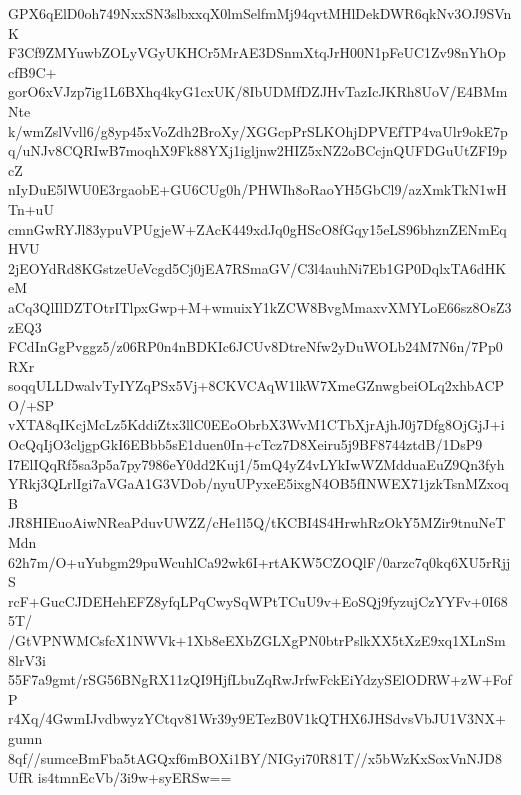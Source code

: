 GPX6qElD0oh749NxxSN3slbxxqX0lmSelfmMj94qvtMHlDekDWR6qkNv3OJ9SVnK
F3Cf9ZMYuwbZOLyVGyUKHCr5MrAE3DSnmXtqJrH00N1pFeUC1Zv98nYhOpcfB9C+
gorO6xVJzp7ig1L6BXhq4kyG1cxUK/8IbUDMfDZJHvTazIcJKRh8UoV/E4BMmNte
k/wmZslVvll6/g8yp45xVoZdh2BroXy/XGGcpPrSLKOhjDPVEfTP4vaUlr9okE7p
q/uNJv8CQRIwB7moqhX9Fk88YXj1igljnw2HIZ5xNZ2oBCcjnQUFDGuUtZFI9pcZ
nIyDuE5lWU0E3rgaobE+GU6CUg0h/PHWIh8oRaoYH5GbCl9/azXmkTkN1wHTn+uU
cmnGwRYJl83ypuVPUgjeW+ZAcK449xdJq0gHScO8fGqy15eLS96bhznZENmEqHVU
2jEOYdRd8KGstzeUeVcgd5Cj0jEA7RSmaGV/C3l4auhNi7Eb1GP0DqlxTA6dHKeM
aCq3QlIlDZTOtrITlpxGwp+M+wmuixY1kZCW8BvgMmaxvXMYLoE66sz8OsZ3zEQ3
FCdInGgPvggz5/z06RP0n4nBDKIc6JCUv8DtreNfw2yDuWOLb24M7N6n/7Pp0RXr
soqqULLDwalvTyIYZqPSx5Vj+8CKVCAqW1lkW7XmeGZnwgbeiOLq2xhbACPO/+SP
vXTA8qIKcjMcLz5KddiZtx3llC0EEoObrbX3WvM1CTbXjrAjhJ0j7Dfg8OjGjJ+i
OcQqIjO3cljgpGkI6EBbb5sE1duen0In+cTcz7D8Xeiru5j9BF8744ztdB/1DsP9
I7ElIQqRf5sa3p5a7py7986eY0dd2Kuj1/5mQ4yZ4vLYkIwWZMdduaEuZ9Qn3fyh
YRkj3QLrlIgi7aVGaA1G3VDob/nyuUPyxeE5ixgN4OB5fINWEX71jzkTsnMZxoqB
JR8HIEuoAiwNReaPduvUWZZ/cHe1l5Q/tKCBI4S4HrwhRzOkY5MZir9tnuNeTMdn
62h7m/O+uYubgm29puWcuhlCa92wk6I+rtAKW5CZOQlF/0arzc7q0kq6XU5rRjjS
rcF+GucCJDEHehEFZ8yfqLPqCwySqWPtTCuU9v+EoSQj9fyzujCzYYFv+0I685T/
/GtVPNWMCsfcX1NWVk+1Xb8eEXbZGLXgPN0btrPslkXX5tXzE9xq1XLnSm8lrV3i
55F7a9gmt/rSG56BNgRX11zQI9HjfLbuZqRwJrfwFckEiYdzySElODRW+zW+FofP
r4Xq/4GwmIJvdbwyzYCtqv81Wr39y9ETezB0V1kQTHX6JHSdvsVbJU1V3NX+gumn
8qf//sumceBmFba5tAGQxf6mBOXi1BY/NIGyi70R81T//x5bWzKxSoxVnNJD8UfR
is4tmnEcVb/3i9w+syERSw==
